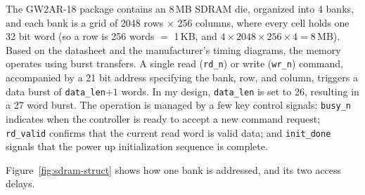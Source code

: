 \documentclass[a4paper,10pt]{article}
\begin{document}
The GW2AR-18 package contains an 8\,MB SDRAM die, organized into 4 banks, and each bank
is a grid of 2048 rows $\times$ 256 columns, where every cell holds one 32 bit word
(so a row is 256 words $=$ 1\,KB, and $4\times2048\times256\times4 = 8$\,MB).
Based on the datasheet and the manufacturer's timing diagrams, 
the memory operates using burst transfers. A single read (\texttt{rd\_n})
 or write (\texttt{wr\_n}) command, accompanied by a 21 bit address specifying the bank,
 row, and column, triggers a data burst of \texttt{data\_len}$+1$ words.
 In my design, \texttt{data\_len} is set to 26, resulting in a 27 word burst.
The operation is managed by a few key control signals: \texttt{busy\_n} 
indicates when the controller is ready to accept a new command request;
 \texttt{rd\_valid} confirms that the current read word is valid data; 
 and \texttt{init\_done} signals that the power up initialization sequence is complete.

Figure~\ref{fig:sdram-struct} shows how one bank is addressed, and its two
access delays.
\end{document}
